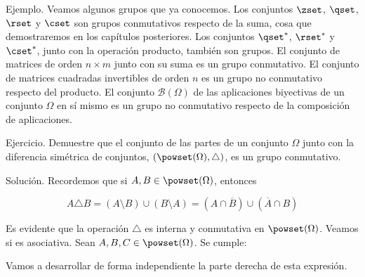 Ejemplo. Veamos algunos grupos que ya conocemos. Los conjuntos $\zset$,
$\qset$, $\rset$ y $\cset$ son grupos conmutativos respecto de la suma, cosa
que demostraremos en los capítulos posteriores. Los conjuntos $\qset^*$,
$\rset^*$ y $\cset^*$, junto con la operación producto, también son grupos.
El conjunto de matrices de orden $n \times m$ junto con su suma es un grupo
conmutativo. El conjunto de matrices cuadradas invertibles de orden $n$ es
un grupo no conmutativo respecto del producto. El conjunto
$\mathcal{B}(\Omega)$ de las aplicaciones biyectivas de un conjunto $\Omega$
en sí mismo es un grupo no conmutativo respecto de la composición de
aplicaciones.

Ejercicio. Demuestre que el conjunto de las partes de un conjunto $\Omega$
junto con la diferencia simétrica de conjuntos, $(\powset(\Omega),
\triangle)$, es un grupo conmutativo.

Solución. Recordemos que si $A, B \in \powset(\Omega)$, entonces 

$$ A \triangle B = (A \setminus B) \cup (B \setminus A) = (A \cap
\overline{B}) \cup (\overline{A} \cap B) $$

Es evidente que la operación $\triangle$ es interna y conmutativa en
$\powset(\Omega)$. Veamos si es asociativa. Sean $A, B, C \in
\powset(\Omega)$. Se cumple:

\iffalse
\begin{align*}
  (A \triangle B) \triangle C
    &= [(A \cap \overline{B}) \cup (\overline{A} \cap B)] \triangle C \\

    &= \left\{[(A \cap \overline{B}) \cup (\overline{A} \cap B)] \cap
      \overline{C}\right\} \cup [\overline{(A \cap \overline{B}) \cup
      (\overline{A} \cap B)} \cap C] \\

    &= [(A \cap \overline{B} \cap \overline{C}) \cup (\overline{A} \cap B
      \cap \overline{C})] \cup \left\{[\overline{(A \cap \overline{B}) \cap \
      \overline{(\overline{A} \cap B)}] \cap C\right\} \\

    &= [(A \cap \overline{B} \cap \overline{C}) \cup (\overline{A} \cap B
      \cap \overline{C})] \cup [(\overline{A} \cup B) \cap (A \cup
      \overline{B})] \cap C \\
\end{align*}
\fi

Vamos a desarrollar de forma independiente la parte derecha de esta
expresión.


